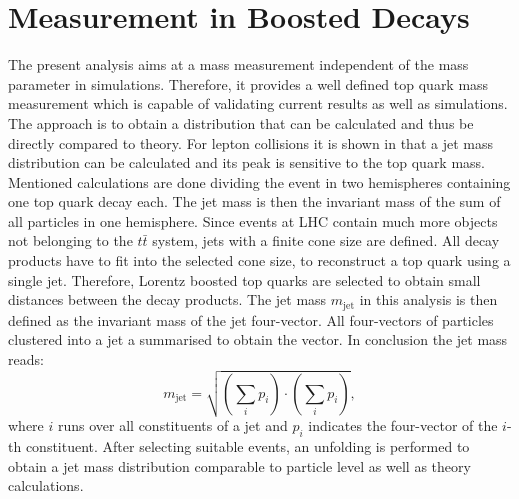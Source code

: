 \section{Measurement in Boosted Decays}
	The present analysis aims at a mass measurement independent of the mass parameter in simulations. Therefore, it provides a well defined top quark mass measurement which is capable of validating current results as well as simulations. The approach is to obtain a distribution that can be calculated and thus be directly compared to theory. For lepton collisions it is shown in \cite{eejetmass} that a jet mass distribution can be calculated and its peak is sensitive to the top quark mass. Mentioned calculations are done dividing the event in two hemispheres containing one top quark decay each. The jet mass is then the invariant mass of the sum of all particles in one hemisphere. Since events at LHC contain much more objects not belonging to the $t\bar{t}$ system, jets with a finite cone size are defined. All decay products have to fit into the selected cone size, to reconstruct a top quark using a single jet. Therefore, Lorentz boosted top quarks are selected to obtain small distances between the decay products. The jet mass $m_\text{jet}$ in this analysis is then defined as the invariant mass of the jet four-vector. All four-vectors of particles clustered into a jet a summarised to obtain the vector. In conclusion the jet mass reads:
	\begin{equation}
	m_\text{jet} = \sqrt{\left( \sum_{i} p_i \right) \cdot \left( \sum_{i} p_i \right)},
	\end{equation}
	where $i$ runs over all constituents of a jet and $p_i$ indicates the four-vector of the $i$-th constituent. After selecting suitable events, an unfolding is performed to obtain a jet mass distribution comparable to particle level as well as theory calculations. 


